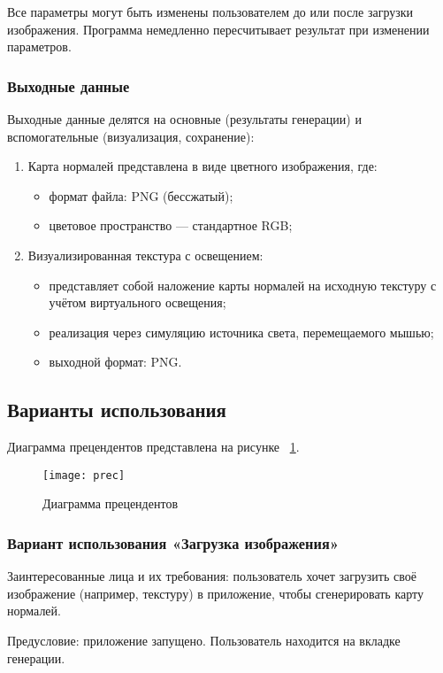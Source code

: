 Все параметры могут быть изменены пользователем до или после загрузки изображения. Программа немедленно пересчитывает результат при изменении параметров.
\subsubsection{Выходные данные}

Выходные данные делятся на основные (результаты генерации) и вспомогательные (визуализация, сохранение):
\begin{enumerate}
	\item Карта нормалей представлена в виде цветного изображения, где:
	\begin{itemize}
		\item формат файла: PNG (бессжатый);
		\item цветовое пространство — стандартное RGB;
	\end{itemize}	
	\item Визуализированная текстура с освещением:
	\begin{itemize}
		\item представляет собой наложение карты нормалей на исходную текстуру с учётом виртуального освещения;
		\item реализация через симуляцию источника света, перемещаемого мышью;
		\item выходной формат: PNG.
	\end{itemize}	
\end{enumerate}
\subsection{Варианты использования}

Диаграмма прецендентов представлена на рисунке ~\ref{prec:image}.

\begin{figure}[ht]
	\texttt{[image: prec]}
	\caption{Диаграмма прецендентов}
	\label{prec:image}
\end{figure}
\subsubsection{Вариант использования «Загрузка изображения»}

Заинтересованные лица и их требования: пользователь хочет загрузить своё изображение (например, текстуру) в приложение, чтобы сгенерировать карту нормалей.

Предусловие: приложение запущено. Пользователь находится на вкладке генерации.


